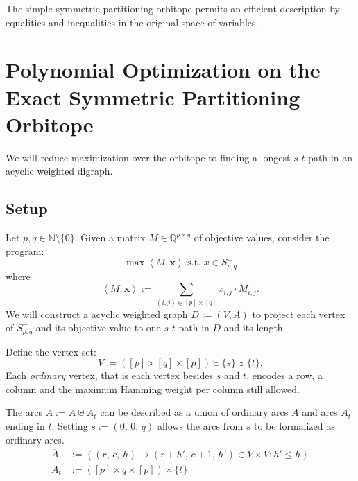 \documentclass{amsart}
\theoremstyle{definition}
\begin{document}
The simple symmetric partitioning orbitope permits an efficient
description by equalities and inequalities in the original space of
variables.



\section{Polynomial Optimization on the Exact Symmetric Partitioning
  Orbitope}
\label{fluss}
We will reduce maximization over the orbitope to finding a longest
\(s\)-\(t\)-path in an acyclic weighted digraph.

\subsection{Setup}

Let \(p, q \in \mathbb{N} \setminus \{0\}\).  Given a matrix \(M \in
\mathbb{Q}^{p \times q}\) of objective values, consider the program:
\begin{equation}
\label{optS}
\max \left<M, \mathbf{x} \right>  \text{ s.t. } x \in S^=_{p,q}
\end{equation}
where \[\left<M, \mathbf{x} \right> := \sum_{(i,j)\in [p]\times [q]} x_{i,j}\cdot M_{i,j}\text{.}\]
We will construct a acyclic weighted graph \(D := (V, A)\) to project each vertex of
\(S^=_{p,q}\) and its objective value to one \(s\)-\(t\)-path in \(D\) and its length.

Define the vertex set:
\[V := \left( [p]\times [q] \times [p]\right) \uplus \{s\} \uplus \{t\}\text{.}\] 
Each \textit{ordinary} vertex, that is
each vertex besides \(s\) and \(t\), encodes a row, a column and the
maximum Hamming weight per column still allowed.

The arcs \(A := \overline{A} \uplus A_t\) can be described as a union
of ordinary arcs \(\overline{A}\) and arcs \(A_t\) ending in \(t\).  Setting
\(s:=(0,\, 0,\,q)\) allows the arcs from $s$ to be formalized as
ordinary arcs.
\begin{align}
  \overline{A} &:=
  \left\{ \left(r,\, c,\, h\right) \rightarrow \left(r+h',\, c+1,\, h'\right) \in V \times V \colon
  h' \leq h \right\} \\
  A_t &:= ([p] \times {q} \times [p]) \times \{t\}
\end{align}
\end{document}
